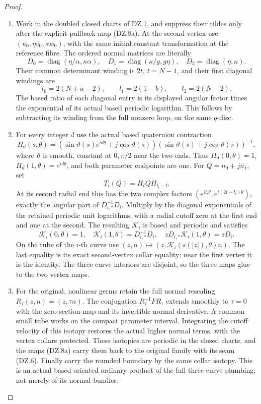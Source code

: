 \begin{proof}
\begin{enumerate}[label=\arabic*.]
\item Work in the doubled closed charts of DZ.1, and suppress their
tildes only after the explicit pullback map (DZ.8a). At the second vertex use
\((u_0,\eta v_0,\kappa w_0)\), with the same initial constant
transformation at the reference fibre. The ordered normal matrices
are literally
\[
 D_0=\operatorname{diag}(\eta/\alpha,\kappa\alpha),\quad
 D_1=\operatorname{diag}(\kappa/g,g\eta),\quad
 D_2=\operatorname{diag}(\eta,\kappa).                \tag{DZ.10}
\]
Their common determinant winding is \(2t\), \(t=N-1\), and their
first diagonal windings are
\[
 l_0=2(N+a-2),\qquad l_1=2(1-b),\qquad
 l_2=2(N-2).                                        \tag{DZ.11}
\]
The based ratio of each diagonal entry is its displayed angular
factor times the exponential of its actual based periodic
logarithm. This follows by subtracting its winding from the full
nonzero loop, on the same \(q\)-disc.

\item For every integer \(d\) use the actual based quaternion contraction
\[
 H_d(s,\theta)=
  (\sin\vartheta(s)e^{id\theta}+j\cos\vartheta(s))
  (\sin\vartheta(s)+j\cos\vartheta(s))^{-1},          \tag{DZ.12}
\]
where \(\vartheta\) is smooth, constant at \(0,\pi/2\) near the two
ends. Thus \(H_d(0,\theta)=1\), \(H_d(1,\theta)=e^{id\theta}\), and
both parameter endpoints are one. For
\(Q=n_0+j\overline{n_1}\), set
\[
              T_i(Q)=H_t Q H_{l_i-t}.               \tag{DZ.13}
\]
At its second radial end this has the two complex factors
\((e^{il_i\theta},e^{i(2t-l_i)\theta})\), exactly the angular part
of \(D_{i,*}^{-1}D_i\). Multiply by the diagonal exponentials of
the retained periodic unit logarithms, with a radial cutoff zero
at the first end and one at the second. The resulting
\(\mathcal K_i\) is based and periodic and satisfies
\[
 \mathcal K_i(0,\theta)=1,\quad
 \mathcal K_i(1,\theta)=D_{i,*}^{-1}D_i,\quad
                   zD_{i,*}\mathcal K_i(1,\theta)=zD_i. \tag{DZ.14}
\]
On the tube of the \(i\)-th curve use
\((z,n)\mapsto(z,\mathcal K_i(s(|z|),\theta)n)\).
The last equality is its exact second-vertex collar equality;
near the first vertex it is the identity. The three curve interiors
are disjoint, so the three maps glue to the two vertex maps.

\item For the original, nonlinear germs retain the full normal rescaling
\(R_\tau(z,n)=(z,\tau n)\). The conjugation
\(R_\tau^{-1}FR_\tau\) extends smoothly to \(\tau=0\) with the
zero-section map and its invertible normal derivative. A common
small tube works on the compact parameter interval. Integrating
the cutoff velocity of this isotopy restores the actual higher
normal terms, with the vertex collars protected. These isotopies
are periodic in the closed charts, and the maps (DZ.8a) carry them
back to the original family with its seam (DZ.6).
Finally carry the rounded boundary by the same collar isotopy.
This is an actual based oriented ordinary product of the full
three-curve plumbing, not merely of its normal bundles.


\end{enumerate}
\end{proof}
